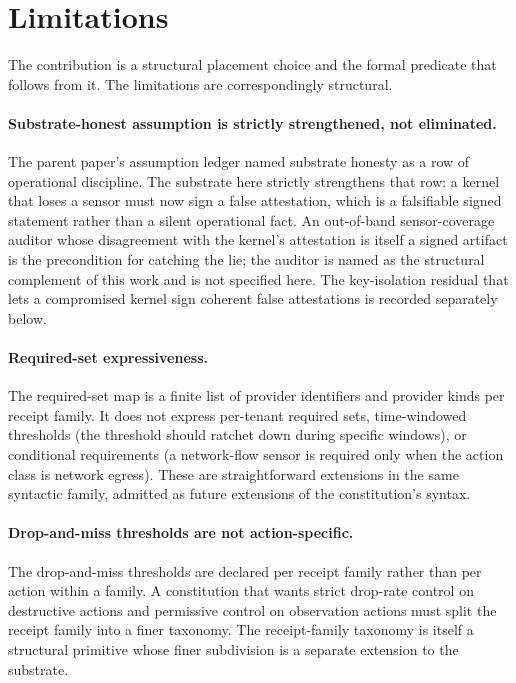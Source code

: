 \section{Limitations}
\label{sec:limits}

The contribution is a structural placement choice and the formal predicate that follows from it. The limitations are correspondingly structural.

\paragraph{Substrate-honest assumption is strictly strengthened, not eliminated.}
The parent paper's assumption ledger named substrate honesty as a row of operational discipline. The substrate here strictly strengthens that row: a kernel that loses a sensor must now sign a false attestation, which is a falsifiable signed statement rather than a silent operational fact. An out-of-band sensor-coverage auditor whose disagreement with the kernel's attestation is itself a signed artifact is the precondition for catching the lie; the auditor is named as the structural complement of this work and is not specified here. The key-isolation residual that lets a compromised kernel sign coherent false attestations is recorded separately below.

\paragraph{Required-set expressiveness.}
The required-set map is a finite list of provider identifiers and provider kinds per receipt family. It does not express per-tenant required sets, time-windowed thresholds (the threshold should ratchet down during specific windows), or conditional requirements (a network-flow sensor is required only when the action class is network egress). These are straightforward extensions in the same syntactic family, admitted as future extensions of the constitution's syntax.

\paragraph{Drop-and-miss thresholds are not action-specific.}
The drop-and-miss thresholds are declared per receipt family rather than per action within a family. A constitution that wants strict drop-rate control on destructive actions and permissive control on observation actions must split the receipt family into a finer taxonomy. The receipt-family taxonomy is itself a structural primitive whose finer subdivision is a separate extension to the substrate.

